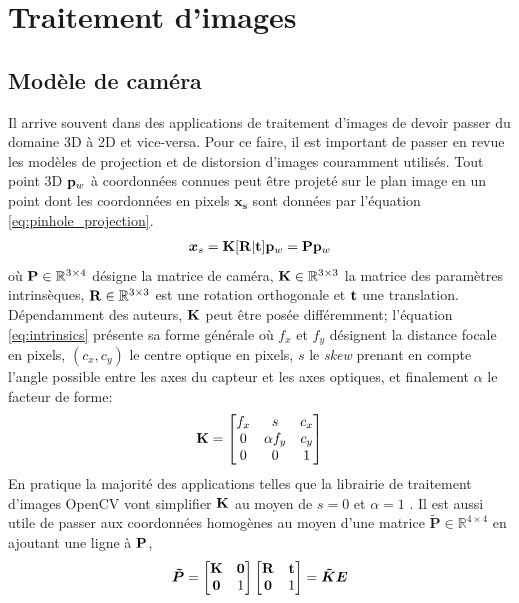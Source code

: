 \section{Traitement d'images}\label{sec:traitement_images}

\subsection{Modèle de caméra}
\label{subsec:modele_camera}
Il arrive souvent dans des applications de traitement d'images de devoir passer du domaine 3D à 2D et vice-versa. Pour ce faire, il est important de passer en revue les modèles de projection et de distorsion d'images couramment utilisés. Tout point 3D $\mathbf{p}_w$ à coordonnées connues peut être projeté sur le plan image en un point dont les coordonnées en pixels $\boldsymbol{x_s}$ sont données par l'équation \ref{eq:pinhole_projection}.
\begin{align}
\boldsymbol{x}_s = \mathbf{K}[\mathbf{R}|\mathbf{t}]\mathbf{p}_w = \mathbf{P} \mathbf{p}_w
\label{eq:pinhole_projection}
\end{align}
où $\mathbf{P} \in \mathbb{R}^{3\times 4}$ désigne la matrice de caméra, $\mathbf{K} \in \mathbb{R}^{3\times3}$ la matrice des paramètres intrinsèques, $\mathbf{R}\in \mathbb{R}^{3\times3}$ est une rotation orthogonale et $\mathbf{t}$ une translation. Dépendamment des auteurs, $\mathbf{K}$ peut être posée différemment; l'équation \ref{eq:intrinsics} présente sa forme générale où $f_x$ et $f_y$ désignent la distance focale en pixels, $(c_x, c_y)$ le centre optique en pixels, $s$ le \textit{skew} prenant en compte l'angle possible entre les axes du capteur et les axes optiques, et finalement $\alpha$ le facteur de forme:
\begin{align}
  \mathbf{K} = \begin{bmatrix}
  f_x & s & c_x \\
  0   & \alpha f_y & c_y \\
  0  &  0  & 1
\end{bmatrix}
\label{eq:intrinsics}
\end{align}
En pratique la majorité des applications telles que la librairie de traitement d'images OpenCV vont simplifier $\mathbf{K}$ au moyen de $s = 0$ et $\alpha = 1$ \citep{itseez2015}. Il est aussi utile de passer aux coordonnées homogènes au moyen d'une matrice $\boldsymbol{\tilde{P}} \in \mathbb{R}^{4\times4}$ en ajoutant une ligne à $\mathbf{P}$,
\begin{align}
  \boldsymbol{\tilde{P}} = \begin{bmatrix}\mathbf{K} & \boldsymbol{0} \\ \boldsymbol{0} & 1\end{bmatrix}
  \begin{bmatrix}\mathbf{R} & \mathbf{t} \\ \boldsymbol{0} & 1\end{bmatrix} = \boldsymbol{\tilde{K}} \boldsymbol{E}
    \label{eq:homogeneous_projection}
\end{align}
